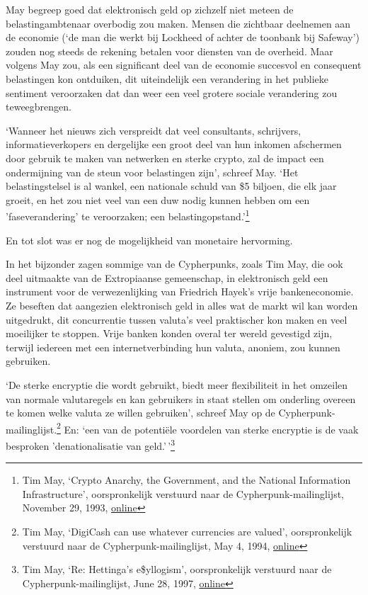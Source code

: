\documentclass[
  a5paper,
  smalldemyvopaper,11pt,twoside,onecolumn,openright,extrafontsizes]{memoir}
\begin{document}
May begreep goed dat elektronisch geld op zichzelf niet meteen de
belastingambtenaar overbodig zou maken. Mensen die zichtbaar deelnemen
aan de economie (`de man die werkt bij Lockheed of achter de toonbank
bij Safeway') zouden nog steeds de rekening betalen voor diensten van de
overheid. Maar volgens May zou, als een significant deel van de economie
succesvol en consequent belastingen kon ontduiken, dit uiteindelijk een
verandering in het publieke sentiment veroorzaken dat dan weer een veel
grotere sociale verandering zou teweegbrengen.

`Wanneer het nieuws zich verspreidt dat veel consultants, schrijvers,
informatieverkopers en dergelijke een groot deel van hun inkomen
afschermen door gebruik te maken van netwerken en sterke crypto, zal de
impact een ondermijning van de steun voor belastingen zijn', schreef
May. `Het belastingstelsel is al wankel, een nationale schuld van \$5
biljoen, die elk jaar groeit, en het zou niet veel van een duw nodig
kunnen hebben om een 'faseverandering' te veroorzaken; een
belastingopstand.'\footnote{Tim May, `Crypto Anarchy, the Government,
  and the National Information Infrastructure', oorspronkelijk verstuurd
  naar de Cypherpunk-mailinglijst, November 29, 1993,
  \href{https://cypherpunks.venona.com/date/1993/11/msg01106.html}{online}}

En tot slot was er nog de mogelijkheid van monetaire hervorming.

In het bijzonder zagen sommige van de Cypherpunks, zoals Tim May, die
ook deel uitmaakte van de Extropiaanse gemeenschap, in elektronisch geld
een instrument voor de verwezenlijking van Friedrich Hayek's vrije
bankeneconomie. Ze beseften dat aangezien elektronisch geld in alles wat
de markt wil kan worden uitgedrukt, dit concurrentie tussen valuta's
veel praktischer kon maken en veel moeilijker te stoppen. Vrije banken
konden overal ter wereld gevestigd zijn, terwijl iedereen met een
internetverbinding hun valuta, anoniem, zou kunnen gebruiken.

`De sterke encryptie die wordt gebruikt, biedt meer flexibiliteit in het
omzeilen van normale valutaregels en kan gebruikers in staat stellen om
onderling overeen te komen welke valuta ze willen gebruiken', schreef
May op de Cypherpunk-mailinglijst.\footnote{Tim May, `DigiCash can use
  whatever currencies are valued', oorspronkelijk verstuurd naar de
  Cypherpunk-mailinglijst, May 4, 1994,
  \href{https://cypherpunks.venona.com/date/1994/05/msg00243.html}{online}}
En: `een van de potentiële voordelen van sterke encryptie is de vaak
besproken 'denationalisatie van geld.'\,'\footnote{Tim May, `Re:
  Hettinga's e\$yllogism', oorspronkelijk verstuurd naar de
  Cypherpunk-mailinglijst, June 28, 1997,
  \href{https://cypherpunks.venona.com/date/1997/06/msg01637.html}{online}}
\end{document}
